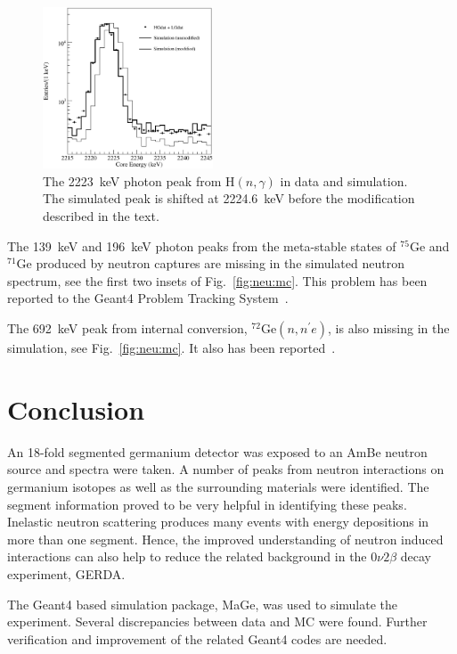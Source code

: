 \begin{figure}[tbhp]
  \centering
  \includegraphics[width=0.45\textwidth]{h2223}
  \caption{The 2223~keV photon peak from H$(n,\gamma)$ in data and
    simulation. The simulated peak is shifted at 2224.6~keV before the
    modification described in the text.}
  \label{fig:neu:h2223}
\end{figure}

The 139~keV and 196~keV photon peaks from the meta-stable states of
$^{75}$Ge and $^{71}$Ge produced by neutron captures are missing in
the simulated neutron spectrum, see the first two insets of
Fig.~\ref{fig:neu:mc}. This problem has been reported to the Geant4
Problem Tracking System~\cite{g4bug3}.

The 692~keV peak from internal conversion, $^{72}$Ge$(n,n^{\prime}e)$, is also missing in the simulation, see Fig.~\ref{fig:neu:mc}. It also has been reported~\cite{g4bug4}.

\section{Conclusion}
\label{sec:neu:out}
An 18-fold segmented germanium detector was exposed to an AmBe neutron
source and spectra were taken. A number of peaks from neutron
interactions on germanium isotopes as well as the surrounding
materials were identified. The segment information proved to be very
helpful in identifying these peaks. Inelastic neutron scattering
produces many events with energy depositions in more than one segment.
Hence, the improved understanding of neutron induced interactions can
also help to reduce the related background in the $0\nu2\beta$ decay
experiment, GERDA.

The Geant4 based simulation package, MaGe, was used to simulate the
experiment. Several discrepancies between data and MC were found.
Further verification and improvement of the related Geant4 codes are
needed.


